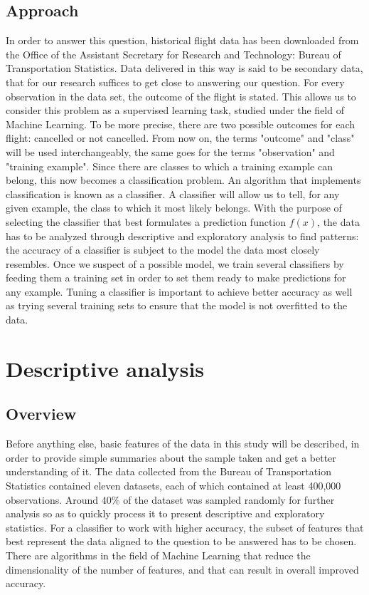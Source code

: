 \documentclass{article}
\begin{document}
    \subsection{Approach}
    In order to answer this question, historical flight data has been downloaded
    from the Office of the Assistant Secretary for Research and Technology: Bureau
    of Transportation Statistics. Data delivered in this way is said to
    be secondary data, that for our research suffices to get close to answering
    our question.\newline
    \indent For every observation in the data set, the outcome of the flight is
    stated. This allows us to consider this problem as a supervised learning task,
    studied under the field of Machine Learning.
    To be more precise, there are two possible outcomes for each flight: cancelled
    or not cancelled. From now on, the terms "outcome" and "class" will be used
    interchangeably, the same goes for the terms "observation" and "training example".
    Since there are classes to which a training example can belong, this now becomes
    a classification problem. An algorithm that implements classification is known
    as a classifier. A classifier will allow us to tell, for any given example, the
    class to which it most likely belongs.\newline
    \indent With the purpose of selecting the
    classifier that best formulates a prediction function $f(x)$, the data has to
    be analyzed through descriptive and exploratory analysis to find patterns: the accuracy of a classifier is subject to
    the model the data most closely resembles. Once we suspect of a possible model,
    we train several classifiers by feeding them a training set in order to set
    them ready to make predictions for any example. Tuning a classifier is important
    to achieve better accuracy as well as trying several training sets
    to ensure that the model is not overfitted to the data.
    \newpage
    \section{Descriptive analysis}
	\subsection{Overview}
	Before anything else, basic features of the data in this study will be described, in order to
	provide simple summaries about the sample taken and get a better understanding of it. The data collected from the Bureau
    of Transportation Statistics contained eleven datasets, each of which contained at least 400,000 observations.
	Around 40\% of the dataset was sampled randomly for further analysis so as to quickly process it to present descriptive
	and exploratory statistics.
	For a classifier to work with higher accuracy, the subset of features that best represent
	the data aligned to the question to be answered has to be chosen. There are
	algorithms in the field of Machine Learning that reduce the dimensionality of
	the number of features, and that can result in overall improved accuracy.
\end{document}
